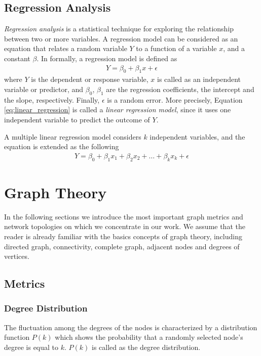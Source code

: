 \subsection{Regression Analysis}

\textit{Regression analysis} is a statistical technique for exploring the relationship between two or more variables. A regression model can be considered as an equation that relates a random variable $Y$ to a function of a variable $x$, and a constant $\beta$. In formally, a regression model is defined as
\begin{align} \label{eq:linear_regression}
	Y = \beta_0 + \beta_1x + \epsilon
\end{align}
where $Y$ is the dependent or response variable, $x$ is called as an independent variable or predictor, and $\beta_0$, $\beta_1$ are the regression coefficients, the intercept and the slope, respectively. Finally, $\epsilon$ is a random error. More precisely, Equation \ref{eq:linear_regression} is called a \textit{linear regression model}, since it uses one independent variable to predict the outcome of $Y$.

A multiple linear regression model considers $k$ independent variables, and the equation is extended as the following
\begin{align}
	Y = \beta_0 + \beta_1x_1 + \beta_2x_2 + \dots + \beta_kx_k + \epsilon
\end{align}

\section{Graph Theory}

In the following sections we introduce the most important graph metrics and network topologies on which we concentrate in our work. We assume that the reader is already familiar with the basics concepts of graph theory, including directed graph, connectivity, complete graph, adjacent nodes and
degrees of vertices.
\subsection{Metrics}

\subsubsection{Degree Distribution}

The fluctuation among the degrees of the nodes is characterized by a distribution function $P(k)$ which shows the probability that a randomly selected node's degree is equal to $k$. $P(k)$ is called as the degree distribution.

